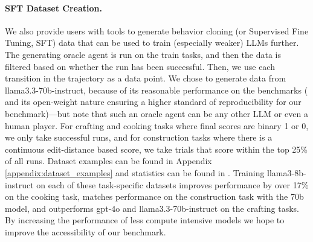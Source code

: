 \documentclass{article}
\begin{document}
\begin{table}[t]
    \centering
    \caption{\textbf{Full results on our MineCollab Task Suite.} This table illustrates the performance of various models across three realistic collaborative task suites requiring between 2-5 agents each: crafting, making a bookshelf out of available materials; cooking, making a meal while coordinating resource collection; and construction, building a structure from a blueprint. 
    We find that we are able to successfully finetune an 8B model using our dataset to perform similarly to llama3.3-70b-instruct and gpt-4o on the crafting and construction task. 
    }
    \label{tab: full_results}
\end{table}

\paragraph{SFT Dataset Creation.}
We also provide users with tools to generate behavior cloning (or Supervised Fine Tuning, SFT) data that can be used to train (especially weaker) LLMs further.
The generating oracle agent is run on the train tasks, and then the data is filtered based on whether the run has been successful. 
Then, we use each transition in the trajectory as a data point.
We chose to generate data from llama3.3-70b-instruct, because of its reasonable performance on the benchmarks ( and its open-weight nature ensuring a higher standard of reproducibility for our benchmark)---but note that such an oracle agent can be any other LLM or even a human player.
For crafting and cooking tasks where final scores are binary 1 or 0, we only take successful runs, and for construction tasks where there is a continuous edit-distance based score, we take trials that score within the top 25\% of all runs.
Dataset examples can be found in Appendix \ref{appendix:dataset_examples} and statistics can be found in . 
Training llama3-8b-instruct on each of these task-specific datasets improves performance by over 17\% on the cooking task, matches performance on the construction task with the 70b model, and outperforms gpt-4o and llama3.3-70b-instruct on the crafting tasks.
By increasing the performance of less compute intensive models we hope to improve the accessibility of our benchmark.
\end{document}
